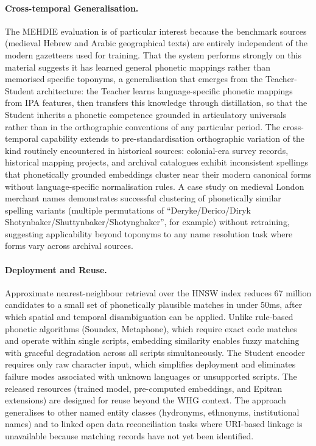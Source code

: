 \documentclass[11pt,a4paper]{article}
\begin{document}
\paragraph{Cross-temporal Generalisation.} The MEHDIE evaluation is of particular interest because the benchmark sources (medieval Hebrew and Arabic geographical texts) are entirely independent of the modern gazetteers used for training. That the system performs strongly on this material suggests it has learned general phonetic mappings rather than memorised specific toponyms, a generalisation that emerges from the Teacher-Student architecture: the Teacher learns language-specific phonetic mappings from IPA features, then transfers this knowledge through distillation, so that the Student inherits a phonetic competence grounded in articulatory universals rather than in the orthographic conventions of any particular period. The cross-temporal capability extends to pre-standardisation orthographic variation of the kind routinely encountered in historical sources: colonial-era survey records, historical mapping projects, and archival catalogues exhibit inconsistent spellings that phonetically grounded embeddings cluster near their modern canonical forms without language-specific normalisation rules. A case study on medieval London merchant names demonstrates successful clustering of phonetically similar spelling variants (multiple permutations of ``Deryke/Derico/Diryk Shotynbaker/Shuttynbaker/Shotyngbaker'', for example) without retraining, suggesting applicability beyond toponyms to any name resolution task where forms vary across archival sources.

\paragraph{Deployment and Reuse.} Approximate nearest-neighbour retrieval over the HNSW index reduces 67 million candidates to a small set of phonetically plausible matches in under 50ms, after which spatial and temporal disambiguation can be applied. Unlike rule-based phonetic algorithms (Soundex, Metaphone), which require exact code matches and operate within single scripts, embedding similarity enables fuzzy matching with graceful degradation across all scripts simultaneously. The Student encoder requires only raw character input, which simplifies deployment and eliminates failure modes associated with unknown languages or unsupported scripts. The released resources (trained model, pre-computed embeddings, and Epitran extensions) are designed for reuse beyond the WHG context. The approach generalises to other named entity classes (hydronyms, ethnonyms, institutional names) and to linked open data reconciliation tasks where URI-based linkage is unavailable because matching records have not yet been identified.
\end{document}
